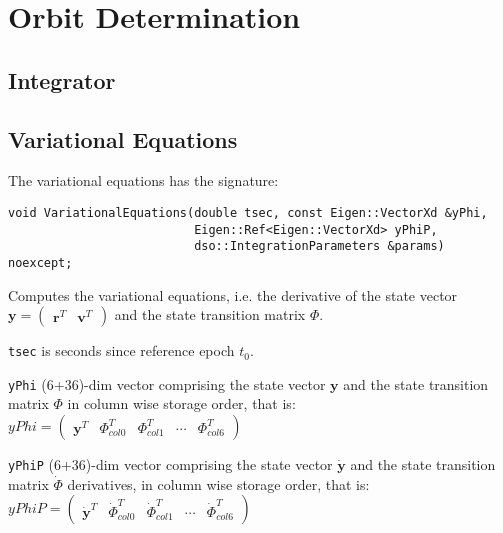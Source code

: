\chapter{Orbit Determination}
\label{ch:orbit-determination}

\section{Integrator}
\label{sec:Integrator}


\section{Variational Equations}
\label{sec:variational-equations}
The variational equations has the signature:

\begin{lstlisting}
void VariationalEquations(double tsec, const Eigen::VectorXd &yPhi,
                          Eigen::Ref<Eigen::VectorXd> yPhiP,
                          dso::IntegrationParameters &params) noexcept;
\end{lstlisting}

Computes the variational equations, i.e. the derivative of the state vector 
$\bm{y} = \begin{pmatrix}\bm{r}^T & \bm{v}^T \end{pmatrix}$ and the state 
transition matrix $\Phi$.

\texttt{tsec} is seconds since reference epoch $t_0$.

\texttt{yPhi} (6+36)-dim vector comprising the state vector $\bm{y}$ and the
state transition matrix $\Phi$ in column wise storage order, that is:
$yPhi = \begin{pmatrix}
    \bm{y}^T &  \Phi ^T _{col0} & \Phi ^T _{col1} & \cdots & \Phi^T _{col6}
\end{pmatrix}$

\texttt{yPhiP} (6+36)-dim vector comprising the state vector 
$\dot{\bm{y}}$ and the state transition matrix $\dot{\Phi}$ derivatives, in 
column wise storage order, that is:
$yPhiP = \begin{pmatrix}
    \dot{\bm{y}}^T &  \dot{\Phi} ^T _{col0} & \dot{\Phi} ^T _{col1} & \cdots & \dot{\Phi} ^T _{col6}
\end{pmatrix}$

